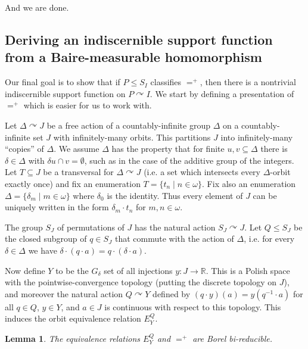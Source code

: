 \documentclass[12pt]{amsart}
\theoremstyle{plain}
\newtheorem{lemma}[theorem]{Lemma}
\theoremstyle{definition}
\begin{document}
And we are done.

\subsection{Deriving an indiscernible support function from a Baire-measurable homomorphism}

Our final goal is to show that if $P \le S_I$ classifies $=^+$, then there is a nontrivial indiscernible support function on $P \curvearrowright I$.
We start by defining a presentation of $=^+$ which is easier for us to work with.

Let $\Delta \curvearrowright J$ be a free action of a countably-infinite group $\Delta$ on a countably-infinite set $J$ with infinitely-many orbits.
This partitions $J$ into infinitely-many ``copies'' of $\Delta$.
We assume $\Delta$ has the property that for finite $u, v \subseteq \Delta$ there is $\delta \in \Delta$ with $\delta u \cap v = \emptyset$, such as in the case of the additive group of the integers.
Let $T \subseteq J$ be a transversal for $\Delta \curvearrowright J$ (i.e. a set which intersects every $\Delta$-orbit exactly once) and fix an enumeration $T = \{t_n \mid n \in \omega \}$.
Fix also an enumeration $\Delta = \{\delta_m \mid m \in \omega\}$ where $\delta_0$ is the identity.
Thus every element of $J$ can be uniquely written in the form $\delta_m \cdot t_n$ for $m, n \in \omega$.

The group $S_J$ of permutations of $J$ has the natural action $S_J \curvearrowright J$.
Let $Q \le S_J$ be the closed subgroup of $q \in S_J$ that commute with the action of $\Delta$, i.e. for every $\delta \in \Delta$ we have $\delta \cdot (q \cdot a) = q \cdot (\delta \cdot a)$.

Now define $Y$ to be the $G_\delta$ set of all injections $y : J \rightarrow \mathbb{R}$.
This is a Polish space with the pointwise-convergence topology (putting the discrete topology on $J$), and moreover the natural action $Q \curvearrowright Y$ defined by $(q \cdot y)(a) = y(q^{-1} \cdot a)$ for all $q \in Q$, $y \in Y$, and $a \in J$ is continuous with respect to this topology.
This induces the orbit equivalence relation $E^Q_Y$.

\begin{lemma}
The equivalence relations $E^Q_Y$ and $=^+$ are Borel bi-reducible.
\end{lemma}
\end{document}
